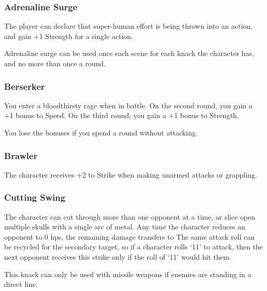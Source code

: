 \begin{multicols}{2}

\subsubsection{Adrenaline Surge}
\label{adrenalinesurge}

The player can declare that super-human effort is being thrown into an action, and gain +1 Strength for a single action.

Adrenaline surge can be used once each scene for each knack the character has, and no more than once a \gls{round}.

\subsubsection{Berserker}

You enter a bloodthirsty rage when in battle.
On the second round, you gain a +1 bonus to Speed.
On the third round, you gain a +1 bonus to Strength.

You lose the bonuses if you spend a round without attacking.

\subsubsection{Brawler}

The character receives +2 to Strike when making unarmed attacks or grappling.

\subsubsection{Cutting Swing}

The character can cut through more than one opponent at a time, or slice open multiple skulls with a single arc of metal.
Any time the character reduces an opponent to 0 \glspl{hp}, the remaining damage transfers to
\iftoggle{verbose}{%
  any other opponent in range as the weapon slices across multiple throats, stomachs, and limbs.
  This process recurs until either no damage or no enemies remain.

}{the next viable target.}
The same attack roll can be recycled for the secondary target, so if a character rolls `11' to attack, then the next opponent receives this strike only if the roll of `11' would hit them.

This knack can only be used with missile weapons if enemies are standing in a direct line.


\end{multicols}
